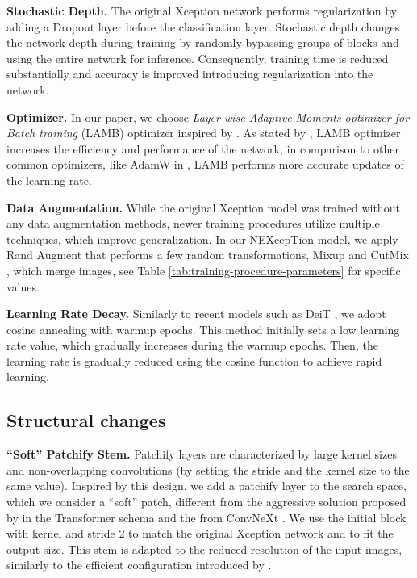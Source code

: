 \textbf{Stochastic Depth.}
The original Xception network performs regularization by adding a Dropout layer before the classification layer.
Stochastic depth \citep{HuangSun2016} changes the network depth during training by randomly bypassing groups of blocks and using the entire network for inference. Consequently, training time is reduced substantially and accuracy is improved introducing regularization into the network.

\textbf{Optimizer.}
In our paper, we choose \textit{Layer-wise Adaptive Moments optimizer for Batch training} (LAMB) optimizer inspired by \citet{YouEtAl2019}. As stated by \citet{WigEtAl2021}, LAMB optimizer increases the efficiency and performance of the network, in comparison to other common optimizers, like AdamW in \citet{LiuEtAl2022}, LAMB performs more accurate updates of the learning rate.


\textbf{Data Augmentation.}
While the original Xception model was trained without any data augmentation methods, newer training procedures utilize multiple techniques, which improve generalization. In our NEXcepTion model, we apply Rand Augment \citep{CubEtAl2019} that performs a few random transformations, Mixup \citep{ZhaEtAl2018} and CutMix \citep{YunEtAl2019}, which merge images, see Table \ref{tab:training-procedure-parameters} for specific values.

\textbf{Learning Rate Decay.}
Similarly to recent models such as DeiT \citep{TouEtAl2020}, we adopt cosine annealing \citep{LosEtAl2018} with warmup epochs. 
This method initially sets a low learning rate value, which gradually increases during the warmup epochs. Then, the learning rate is gradually reduced using the cosine function to achieve rapid learning. 

\subsection{Structural changes}
\textbf{``Soft'' Patchify Stem.}
Patchify layers are characterized by large kernel sizes and non-overlapping convolutions (by setting the stride and the kernel size to the same value). Inspired by this design, we add a  patchify layer to the search space, which we consider a ``soft'' patch, different from the aggressive  solution proposed by \citet{DosEtAl2020} in the Transformer schema and the  from ConvNeXt \citep{LiuEtAl2022}.
We use the initial block with kernel  and stride 2 to match the original Xception network and to fit the output size. 
This stem is adapted to the reduced resolution of the input images, similarly to the efficient configuration introduced by \citet{CorEtAl2019}.

